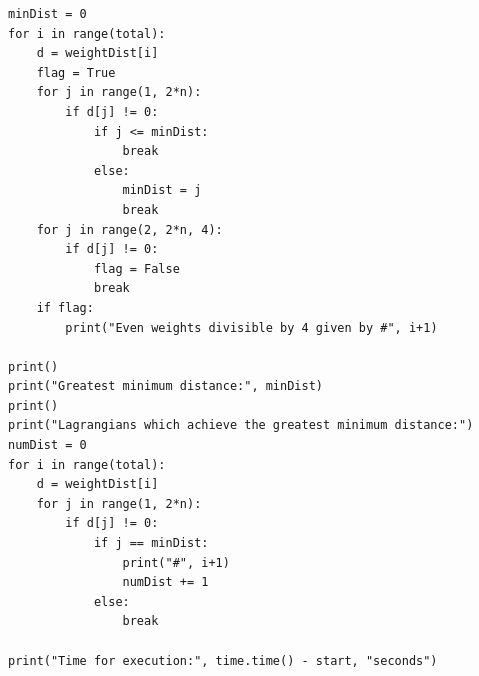 \documentclass[a4paper,reqno]{amsart}
\theoremstyle{definition}
\theoremstyle{remark} \newtheorem{remark}[theorem]{Remark}
\numberwithin{equation}{section}
\begin{document}
\begin{verbatim}
minDist = 0
for i in range(total):
    d = weightDist[i]
    flag = True
    for j in range(1, 2*n):
        if d[j] != 0:
            if j <= minDist:
                break
            else:
                minDist = j
                break
    for j in range(2, 2*n, 4):
        if d[j] != 0:
            flag = False
            break
    if flag:
        print("Even weights divisible by 4 given by #", i+1)
        
print()
print("Greatest minimum distance:", minDist)
print()
print("Lagrangians which achieve the greatest minimum distance:")
numDist = 0
for i in range(total):
    d = weightDist[i]
    for j in range(1, 2*n):
        if d[j] != 0:
            if j == minDist:
                print("#", i+1)
                numDist += 1
            else:
                break

print("Time for execution:", time.time() - start, "seconds")
\end{verbatim}
\end{document}
